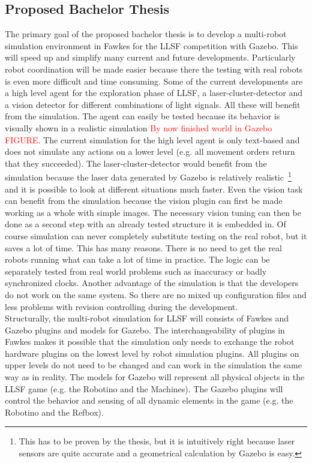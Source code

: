 \documentclass[11pt,a4paper,titlepage]{article}
\begin{document}
\subsection{Proposed Bachelor Thesis}
The primary goal of the proposed bachelor thesis is to develop a multi-robot simulation environment in Fawkes for the LLSF competition with Gazebo. This will speed up and simplify many current and future developments. Particularly robot coordination will be made easier because there the testing with real robots is even more difficult and time consuming. Some of the current developments are a high level agent for the exploration phase of LLSF, a laser-cluster-detector and a vision detector for different combinations of light signals. All these will benefit from the simulation. The agent can easily be tested because its behavior is visually shown in  a realistic simulation \textcolor{red}{By now finished world in Gazebo FIGURE}. The current simulation for the high level agent is only text-based and does not simulate any actions on a lower level (e.g. all movement orders return that they succeeded). The laser-cluster-detector would benefit from the simulation because the laser data generated by Gazebo is relatively realistic~\footnote{This has to be proven by the thesis, but it is intuitively right because laser sensors are quite accurate and a geometrical calculation by Gazebo is easy.} and it is possible to look at different situations much faster. Even the vision task can benefit from the simulation because the vision plugin can first be made working as a whole with simple images. The necessary vision tuning can then be done as a second step with an already tested structure it is embedded in. Of course simulation can never completely substitute testing on the real robot, but it saves a lot of time. This has many reasons. There is no need to get the real robots running what can take a lot of time in practice. The logic can be separately tested from real world problems such as inaccuracy or badly synchronized clocks. Another advantage of the simulation is that the developers do not work on the same system. So there are no mixed up configuration files and less problems with revision controlling during the development.\\
Structurally, the multi-robot simulation for LLSF will consists of Fawkes and Gazebo plugins and models for Gazebo. The interchangeability of plugins in Fawkes makes it possible that the simulation only needs to exchange the robot hardware plugins on the lowest level by robot simulation plugins. All plugins on upper levels do not need to be changed and can work in the simulation the same way as in reality. The models for Gazebo will represent all physical objects in the LLSF game (e.g. the Robotino and the Machines). The Gazebo plugins will control the behavior and sensing of all dynamic elements in the game (e.g. the Robotino and the Refbox).\\
\end{document}
